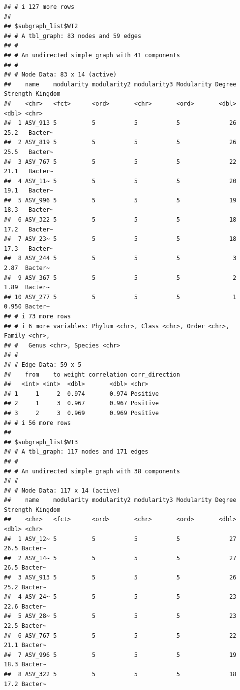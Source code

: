 \documentclass[
]{book}
\begin{document}
\begin{verbatim}
## # i 127 more rows
## 
## $subgraph_list$WT2
## # A tbl_graph: 83 nodes and 59 edges
## #
## # An undirected simple graph with 41 components
## #
## # Node Data: 83 x 14 (active)
##    name    modularity modularity2 modularity3 Modularity Degree Strength Kingdom
##    <chr>   <fct>      <ord>       <chr>       <ord>       <dbl>    <dbl> <chr>  
##  1 ASV_913 5          5           5           5              26   25.2   Bacter~
##  2 ASV_819 5          5           5           5              26   25.5   Bacter~
##  3 ASV_767 5          5           5           5              22   21.1   Bacter~
##  4 ASV_11~ 5          5           5           5              20   19.1   Bacter~
##  5 ASV_996 5          5           5           5              19   18.3   Bacter~
##  6 ASV_322 5          5           5           5              18   17.2   Bacter~
##  7 ASV_23~ 5          5           5           5              18   17.3   Bacter~
##  8 ASV_244 5          5           5           5               3    2.87  Bacter~
##  9 ASV_367 5          5           5           5               2    1.89  Bacter~
## 10 ASV_277 5          5           5           5               1    0.950 Bacter~
## # i 73 more rows
## # i 6 more variables: Phylum <chr>, Class <chr>, Order <chr>, Family <chr>,
## #   Genus <chr>, Species <chr>
## #
## # Edge Data: 59 x 5
##    from    to weight correlation corr_direction
##   <int> <int>  <dbl>       <dbl> <chr>         
## 1     1     2  0.974       0.974 Positive      
## 2     1     3  0.967       0.967 Positive      
## 3     2     3  0.969       0.969 Positive      
## # i 56 more rows
## 
## $subgraph_list$WT3
## # A tbl_graph: 117 nodes and 171 edges
## #
## # An undirected simple graph with 38 components
## #
## # Node Data: 117 x 14 (active)
##    name    modularity modularity2 modularity3 Modularity Degree Strength Kingdom
##    <chr>   <fct>      <ord>       <chr>       <ord>       <dbl>    <dbl> <chr>  
##  1 ASV_12~ 5          5           5           5              27     26.5 Bacter~
##  2 ASV_14~ 5          5           5           5              27     26.5 Bacter~
##  3 ASV_913 5          5           5           5              26     25.2 Bacter~
##  4 ASV_24~ 5          5           5           5              23     22.6 Bacter~
##  5 ASV_28~ 5          5           5           5              23     22.5 Bacter~
##  6 ASV_767 5          5           5           5              22     21.1 Bacter~
##  7 ASV_996 5          5           5           5              19     18.3 Bacter~
##  8 ASV_322 5          5           5           5              18     17.2 Bacter~

\end{verbatim}
\end{document}
